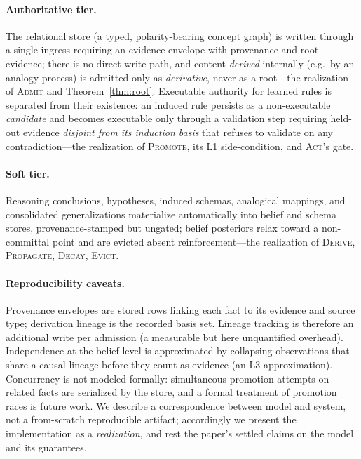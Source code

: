 \documentclass[11pt]{article}
\theoremstyle{plain}
\theoremstyle{definition}
\begin{document}
\paragraph{Authoritative tier.} The relational store (a typed, polarity-bearing
concept graph) is written through a single ingress requiring an evidence envelope
with provenance and root evidence; there is no direct-write path, and content
\emph{derived} internally (e.g.\ by an analogy process) is admitted only as
\emph{derivative}, never as a root---the realization of \textsc{Admit} and
Theorem~\ref{thm:root}. Executable authority for learned rules is separated from
their existence: an induced rule persists as a non-executable \emph{candidate} and
becomes executable only through a validation step requiring held-out evidence
\emph{disjoint from its induction basis} that refuses to validate on any
contradiction---the realization of \textsc{Promote}, its L1 side-condition, and
\textsc{Act}'s gate.

\paragraph{Soft tier.} Reasoning conclusions, hypotheses, induced schemas,
analogical mappings, and consolidated generalizations materialize automatically
into belief and schema stores, provenance-stamped but ungated; belief posteriors
relax toward a non-committal point and are evicted absent reinforcement---the
realization of \textsc{Derive}, \textsc{Propagate}, \textsc{Decay}, \textsc{Evict}.

\paragraph{Reproducibility caveats.} Provenance envelopes are stored rows linking
each fact to its evidence and source type; derivation lineage is the recorded
basis set. Lineage tracking is therefore an additional write per admission (a
measurable but here unquantified overhead). Independence at the belief level is
approximated by collapsing observations that share a causal lineage before they
count as evidence (an L3 approximation). Concurrency is not modeled formally:
simultaneous promotion attempts on related facts are serialized by the store, and
a formal treatment of promotion races is future work. We describe a correspondence
between model and system, not a from-scratch reproducible artifact; accordingly we
present the implementation as a \emph{realization}, and rest the paper's settled
claims on the model and its guarantees.
\end{document}
